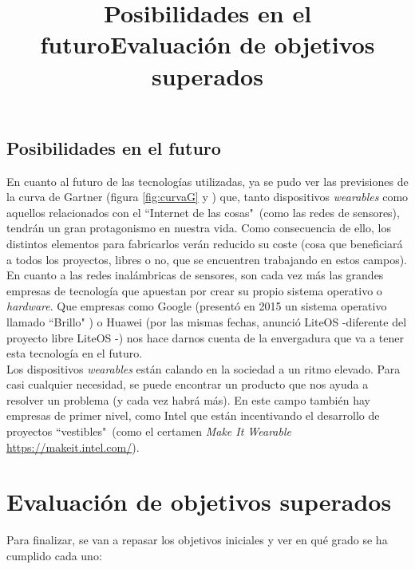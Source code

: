 \subsection{Posibilidades en el futuro}
\title{Posibilidades en el futuro}
En cuanto al futuro de las tecnologías utilizadas, ya se pudo ver las previsiones
de la curva de Gartner (figura \ref{fig:curvaG} y \cite{gartnercurve}) que, tanto dispositivos \textit{wearables} como
aquellos relacionados con el ``Internet de las cosas"\ (como las redes de sensores), tendrán un gran protagonismo
en nuestra vida. Como consecuencia de ello, los distintos elementos para fabricarlos
verán reducido su coste (cosa que beneficiará a todos los proyectos, libres o no, que se encuentren trabajando en estos
campos).\\

En cuanto a las redes inalámbricas de sensores, son cada vez más las grandes empresas
de tecnología que apuestan por crear su propio sistema operativo o \textit{hardware}. Que empresas como Google (presentó
en 2015 un sistema operativo llamado ``Brillo" \cite{brillo}) o Huawei (por las mismas fechas, anunció LiteOS -diferente
del proyecto libre LiteOS \cite{liteos}-) nos hace darnos cuenta de la envergadura que
va a tener esta tecnología en el futuro.\\

Los dispositivos \textit{wearables} están calando en la sociedad a un ritmo elevado. Para casi
cualquier necesidad, se puede encontrar un producto que nos ayuda a resolver un problema (y cada vez habrá más).
En este campo también hay empresas de primer nivel, como Intel que están incentivando el desarrollo
de proyectos ``vestibles"\ (como el certamen \textit{Make It Wearable} \url{https://makeit.intel.com/}).\\


\section{Evaluación de objetivos superados}
\title{Evaluación de objetivos superados}

Para finalizar, se van a repasar los objetivos iniciales y ver en qué grado se ha
cumplido cada uno:

